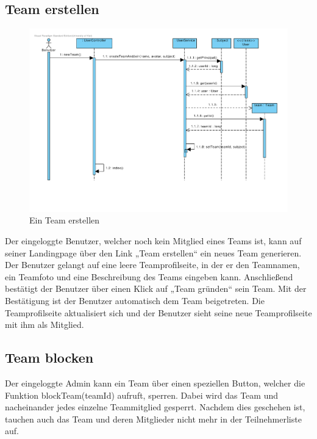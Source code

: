 \subsection{Team erstellen}
\begin{figure}[H]
  \centering
  \includegraphics[width=\textwidth, clip]{gfx/team_erstellen}
  \caption{Ein Team erstellen}
\end{figure}

Der eingeloggte Benutzer, welcher noch kein Mitglied eines Teams ist,
kann auf seiner Landingpage über den Link „Team erstellen“ ein neues
Team generieren. Der Benutzer gelangt auf eine leere Teamprofilseite,
in der er den Teamnamen, ein Teamfoto und eine Beschreibung des Teams
eingeben kann. Anschließend bestätigt der Benutzer über einen Klick
auf „Team gründen“ sein Team. Mit der Bestätigung ist der Benutzer
automatisch dem Team beigetreten. Die Teamprofilseite aktualisiert
sich und der Benutzer sieht seine neue Teamprofilseite mit ihm als
Mitglied.\\

\subsection{Team blocken}
Der eingeloggte Admin kann ein Team über einen speziellen Button, welcher die Funktion blockTeam(teamId) aufruft, sperren. Dabei wird das Team und nacheinander jedes einzelne Teammitglied gesperrt. Nachdem dies geschehen ist, tauchen auch das Team und deren Mitglieder nicht mehr in der Teilnehmerliste auf.\\

